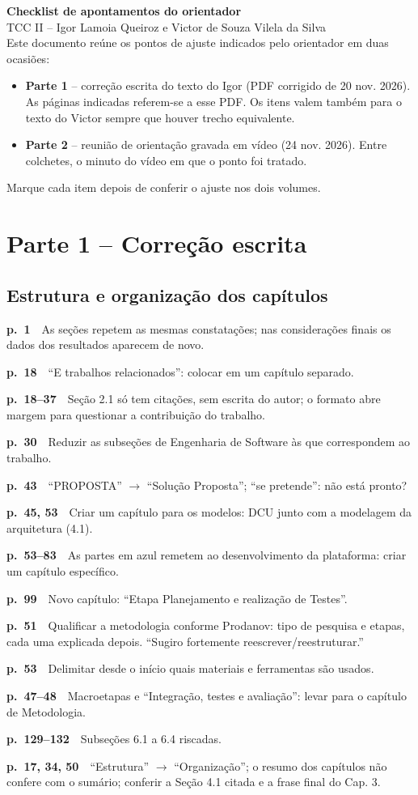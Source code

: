 \documentclass[11pt,a4paper]{article}
\newcommand{\pg}[1]{\textbf{p.~#1}\ \ }
\begin{document}
{\LARGE\bfseries Checklist de apontamentos do orientador}\\[4pt]
{\large TCC II -- Igor Lamoia Queiroz e Victor de Souza Vilela da Silva}\\[8pt]
Este documento reúne os pontos de ajuste indicados pelo orientador em duas ocasiões:
\begin{itemize}[leftmargin=1.2em,itemsep=0pt]
  \item \textbf{Parte 1} -- correção escrita do texto do Igor (PDF corrigido de 20 nov. 2026). As páginas indicadas referem-se a esse PDF. Os itens valem também para o texto do Victor sempre que houver trecho equivalente.
  \item \textbf{Parte 2} -- reunião de orientação gravada em vídeo (24 nov. 2026). Entre colchetes, o minuto do vídeo em que o ponto foi tratado.
\end{itemize}
Marque cada item depois de conferir o ajuste nos dois volumes.
\section*{Parte 1 -- Correção escrita}
\subsection*{Estrutura e organização dos capítulos}
\begin{checklist}
  \item \pg{1}As seções repetem as mesmas constatações; nas considerações finais os dados dos resultados aparecem de novo.
  \item \pg{18}“E trabalhos relacionados”: colocar em um capítulo separado.
  \item \pg{18--37}Seção 2.1 só tem citações, sem escrita do autor; o formato abre margem para questionar a contribuição do trabalho.
  \item \pg{30}Reduzir as subseções de Engenharia de Software às que correspondem ao trabalho.
  \item \pg{43}“PROPOSTA” $\rightarrow$ “Solução Proposta”; “se pretende”: não está pronto?
  \item \pg{45, 53}Criar um capítulo para os modelos: DCU junto com a modelagem da arquitetura (4.1).
  \item \pg{53--83}As partes em azul remetem ao desenvolvimento da plataforma: criar um capítulo específico.
  \item \pg{99}Novo capítulo: “Etapa Planejamento e realização de Testes”.
  \item \pg{51}Qualificar a metodologia conforme Prodanov: tipo de pesquisa e etapas, cada uma explicada depois. “Sugiro fortemente reescrever/reestruturar.”
  \item \pg{53}Delimitar desde o início quais materiais e ferramentas são usados.
  \item \pg{47--48}Macroetapas e “Integração, testes e avaliação”: levar para o capítulo de Metodologia.
  \item \pg{129--132}Subseções 6.1 a 6.4 riscadas.
  \item \pg{17, 34, 50}“Estrutura” $\rightarrow$ “Organização”; o resumo dos capítulos não confere com o sumário; conferir a Seção 4.1 citada e a frase final do Cap. 3.
\end{checklist}
\end{document}
